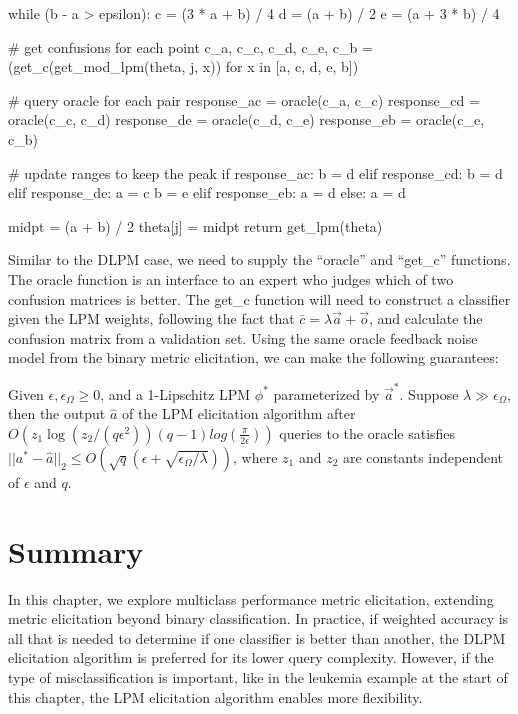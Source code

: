 \documentclass[
  letterpaper,
  DIV=11,
  numbers=noendperiod,
  oneside]{scrreprt}
\theoremstyle{remark}
\begin{document}
while (b - a \textgreater{} epsilon): c = (3 * a + b) / 4 d = (a + b) /
2 e = (a + 3 * b) / 4

\# get confusions for each point c\_a, c\_c, c\_d, c\_e, c\_b =
(get\_c(get\_mod\_lpm(theta, j, x)) for x in {[}a, c, d, e, b{]})

\# query oracle for each pair response\_ac = oracle(c\_a, c\_c)
response\_cd = oracle(c\_c, c\_d) response\_de = oracle(c\_d, c\_e)
response\_eb = oracle(c\_e, c\_b)

\# update ranges to keep the peak if response\_ac: b = d elif
response\_cd: b = d elif response\_de: a = c b = e elif response\_eb: a
= d else: a = d

midpt = (a + b) / 2 theta{[}j{]} = midpt return get\_lpm(theta)

Similar to the DLPM case, we need to supply the ``oracle'' and
``get\_c'' functions. The oracle function is an interface to an expert
who judges which of two confusion matrices is better. The get\_c
function will need to construct a classifier given the LPM weights,
following the fact that \(\bar{c} = \lambda \vec{a} + \vec{o}\), and
calculate the confusion matrix from a validation set. Using the same
oracle feedback noise model from the binary metric elicitation, we can
make the following guarantees:

Given \(\epsilon, \epsilon_\Omega \geq 0\), and a 1-Lipschitz LPM
\(\phi^*\) parameterized by \(\vec{a}^*\). Suppose
\(\lambda \gg \epsilon_\Omega\), then the output \(\hat{a}\) of the LPM
elicitation algorithm after
\(O(z_1 \log(z_2/(q\epsilon^2))(q-1) log(\frac{\pi}{2\epsilon}))\)
queries to the oracle satisfies
\(||a^* - \hat{a}||_2 \leq O(\sqrt{q}(\epsilon + \sqrt{\epsilon_\Omega/\lambda}))\),
where \(z_1\) and \(z_2\) are constants independent of \(\epsilon\) and
\(q\).

\section{Summary}\label{summary}

In this chapter, we explore multiclass performance metric elicitation,
extending metric elicitation beyond binary classification. In practice,
if weighted accuracy is all that is needed to determine if one
classifier is better than another, the DLPM elicitation algorithm is
preferred for its lower query complexity. However, if the type of
misclassification is important, like in the leukemia example at the
start of this chapter, the LPM elicitation algorithm enables more
flexibility.
\end{document}
